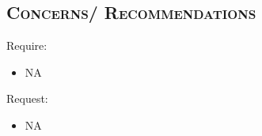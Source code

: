 \begin{resume}
\section{\textsc{Concerns/ Recommendations}}
Require:
\begin{itemize}
\item NA
\end{itemize}

Request:
\begin{itemize}
\item NA 
\end{itemize}





\end{resume}

